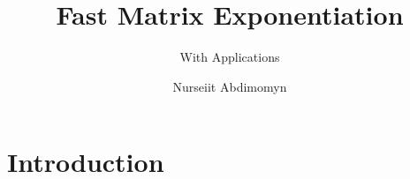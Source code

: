 \documentclass{beamer}
\title{Fast Matrix Exponentiation}
\subtitle{With Applications}
\institute{UNIST}
\author{Nurseiit Abdimomyn}
\begin{document}
\begin{frame}
	\titlepage
\end{frame}

\iffalse
    \begin{frame}{Table of contents}
      \tableofcontents
    \end{frame}

    \begin{frame}{Introduction}
    	\begin{block}{\LaTeX\ Beamer}
    		LaTeX Beamer is a powerful tool to create presentations
    	\end{block}
    	\pause
    	\begin{block}{Export to PDF}
    		It produces platform-independent presentations in PDF
    	\end{block}	
    \end{frame}
\fi

\section{Introduction}

\iffalse
    \begin{frame}{Blocks}
    	\begin{block}{This is block}
    		Using \textit{blocks} is a handy way to present your text
    	\end{block}
    	\pause
    	\begin{block}{Pause between}
    		You can also insert a pause between blocks
    	\end{block}	
    \end{frame}
\fi
\end{document}
